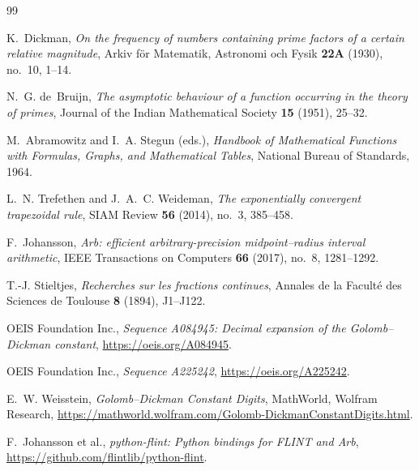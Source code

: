 \documentclass[11pt,a4paper]{article}
\theoremstyle{remark}
\begin{document}
\begin{thebibliography}{99}

K.~Dickman,
\emph{On the frequency of numbers containing prime factors of a certain
relative magnitude},
Arkiv f\"or Matematik, Astronomi och Fysik \textbf{22A} (1930), no.~10,
1--14.

N.~G. de~Bruijn,
\emph{The asymptotic behaviour of a function occurring in the theory of
primes},
Journal of the Indian Mathematical Society \textbf{15} (1951), 25--32.

M.~Abramowitz and I.~A. Stegun (eds.),
\emph{Handbook of Mathematical Functions with Formulas, Graphs, and
Mathematical Tables},
National Bureau of Standards, 1964.

L.~N. Trefethen and J.~A.~C. Weideman,
\emph{The exponentially convergent trapezoidal rule},
SIAM Review \textbf{56} (2014), no.~3, 385--458.

F.~Johansson,
\emph{Arb: efficient arbitrary-precision midpoint--radius interval
arithmetic},
IEEE Transactions on Computers \textbf{66} (2017), no.~8, 1281--1292.

T.-J. Stieltjes,
\emph{Recherches sur les fractions continues},
Annales de la Facult\'e des Sciences de Toulouse \textbf{8} (1894),
J1--J122.

OEIS Foundation Inc.,
\emph{Sequence A084945: Decimal expansion of the Golomb--Dickman
constant},
\url{https://oeis.org/A084945}.

OEIS Foundation Inc.,
\emph{Sequence A225242},
\url{https://oeis.org/A225242}.

E.~W. Weisstein,
\emph{Golomb--Dickman Constant Digits},
MathWorld, Wolfram Research,
\url{https://mathworld.wolfram.com/Golomb-DickmanConstantDigits.html}.

F.~Johansson et al.,
\emph{python-flint: Python bindings for FLINT and Arb},
\url{https://github.com/flintlib/python-flint}.

\end{thebibliography}
\end{document}
